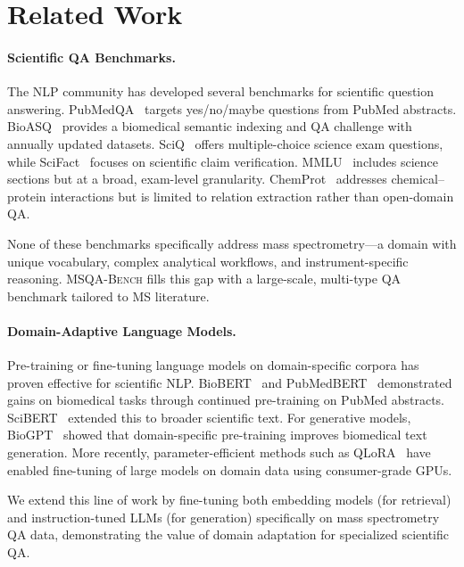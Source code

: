 \documentclass[11pt]{article}
\newcommand{\msqa}{\textsc{MSQA-Bench}}
\begin{document}
\section{Related Work}
\label{sec:related_work}

\paragraph{Scientific QA Benchmarks.}
The NLP community has developed several benchmarks for scientific question answering. PubMedQA~\citep{jin2019pubmedqa} targets yes/no/maybe questions from PubMed abstracts. BioASQ~\citep{tsatsaronis2015overview} provides a biomedical semantic indexing and QA challenge with annually updated datasets. SciQ~\citep{welbl2017crowdsourcing} offers multiple-choice science exam questions, while SciFact~\citep{wadden2020fact} focuses on scientific claim verification. MMLU~\citep{hendrycks2021measuring} includes science sections but at a broad, exam-level granularity. ChemProt~\citep{taboureau2011chemprot} addresses chemical--protein interactions but is limited to relation extraction rather than open-domain QA.

None of these benchmarks specifically address mass spectrometry---a domain with unique vocabulary, complex analytical workflows, and instrument-specific reasoning. \msqa{} fills this gap with a large-scale, multi-type QA benchmark tailored to MS literature.

\paragraph{Domain-Adaptive Language Models.}
Pre-training or fine-tuning language models on domain-specific corpora has proven effective for scientific NLP. BioBERT~\citep{lee2020biobert} and PubMedBERT~\citep{gu2021domain} demonstrated gains on biomedical tasks through continued pre-training on PubMed abstracts. SciBERT~\citep{beltagy2019scibert} extended this to broader scientific text. For generative models, BioGPT~\citep{luo2022biogpt} showed that domain-specific pre-training improves biomedical text generation. More recently, parameter-efficient methods such as QLoRA~\citep{dettmers2024qlora} have enabled fine-tuning of large models on domain data using consumer-grade GPUs.

We extend this line of work by fine-tuning both embedding models (for retrieval) and instruction-tuned LLMs (for generation) specifically on mass spectrometry QA data, demonstrating the value of domain adaptation for specialized scientific QA.
\end{document}
